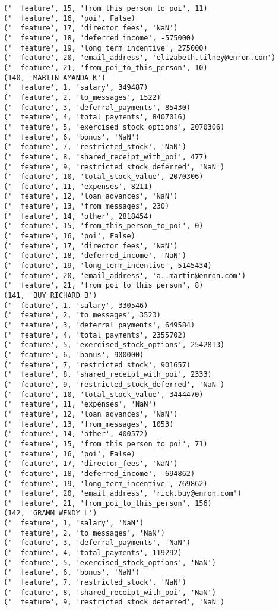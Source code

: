 \begin{verbatim}
('  feature', 15, 'from_this_person_to_poi', 11)
('  feature', 16, 'poi', False)
('  feature', 17, 'director_fees', 'NaN')
('  feature', 18, 'deferred_income', -575000)
('  feature', 19, 'long_term_incentive', 275000)
('  feature', 20, 'email_address', 'elizabeth.tilney@enron.com')
('  feature', 21, 'from_poi_to_this_person', 10)
(140, 'MARTIN AMANDA K')
('  feature', 1, 'salary', 349487)
('  feature', 2, 'to_messages', 1522)
('  feature', 3, 'deferral_payments', 85430)
('  feature', 4, 'total_payments', 8407016)
('  feature', 5, 'exercised_stock_options', 2070306)
('  feature', 6, 'bonus', 'NaN')
('  feature', 7, 'restricted_stock', 'NaN')
('  feature', 8, 'shared_receipt_with_poi', 477)
('  feature', 9, 'restricted_stock_deferred', 'NaN')
('  feature', 10, 'total_stock_value', 2070306)
('  feature', 11, 'expenses', 8211)
('  feature', 12, 'loan_advances', 'NaN')
('  feature', 13, 'from_messages', 230)
('  feature', 14, 'other', 2818454)
('  feature', 15, 'from_this_person_to_poi', 0)
('  feature', 16, 'poi', False)
('  feature', 17, 'director_fees', 'NaN')
('  feature', 18, 'deferred_income', 'NaN')
('  feature', 19, 'long_term_incentive', 5145434)
('  feature', 20, 'email_address', 'a..martin@enron.com')
('  feature', 21, 'from_poi_to_this_person', 8)
(141, 'BUY RICHARD B')
('  feature', 1, 'salary', 330546)
('  feature', 2, 'to_messages', 3523)
('  feature', 3, 'deferral_payments', 649584)
('  feature', 4, 'total_payments', 2355702)
('  feature', 5, 'exercised_stock_options', 2542813)
('  feature', 6, 'bonus', 900000)
('  feature', 7, 'restricted_stock', 901657)
('  feature', 8, 'shared_receipt_with_poi', 2333)
('  feature', 9, 'restricted_stock_deferred', 'NaN')
('  feature', 10, 'total_stock_value', 3444470)
('  feature', 11, 'expenses', 'NaN')
('  feature', 12, 'loan_advances', 'NaN')
('  feature', 13, 'from_messages', 1053)
('  feature', 14, 'other', 400572)
('  feature', 15, 'from_this_person_to_poi', 71)
('  feature', 16, 'poi', False)
('  feature', 17, 'director_fees', 'NaN')
('  feature', 18, 'deferred_income', -694862)
('  feature', 19, 'long_term_incentive', 769862)
('  feature', 20, 'email_address', 'rick.buy@enron.com')
('  feature', 21, 'from_poi_to_this_person', 156)
(142, 'GRAMM WENDY L')
('  feature', 1, 'salary', 'NaN')
('  feature', 2, 'to_messages', 'NaN')
('  feature', 3, 'deferral_payments', 'NaN')
('  feature', 4, 'total_payments', 119292)
('  feature', 5, 'exercised_stock_options', 'NaN')
('  feature', 6, 'bonus', 'NaN')
('  feature', 7, 'restricted_stock', 'NaN')
('  feature', 8, 'shared_receipt_with_poi', 'NaN')
('  feature', 9, 'restricted_stock_deferred', 'NaN')

\end{verbatim}
